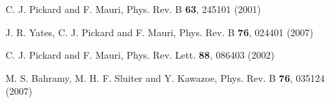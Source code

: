 \documentclass[a4paper,11pt,twoside]{article}
\begin{document}
\begin{thebibliography}{99}
  C. J. Pickard and F. Mauri, Phys. Rev. B \textbf{63}, 245101 (2001)

  J. R. Yates, C. J. Pickard and F. Mauri, Phys. Rev. B \textbf{76}, 024401 (2007)

  C. J. Pickard and F. Mauri, Phys. Rev. Lett. \textbf{88}, 086403 (2002)


  M. S. Bahramy, M. H. F. Sluiter and Y. Kawazoe, Phys. Rev. B  \textbf{76}, 035124 (2007)
\end{thebibliography}

\end{document}
